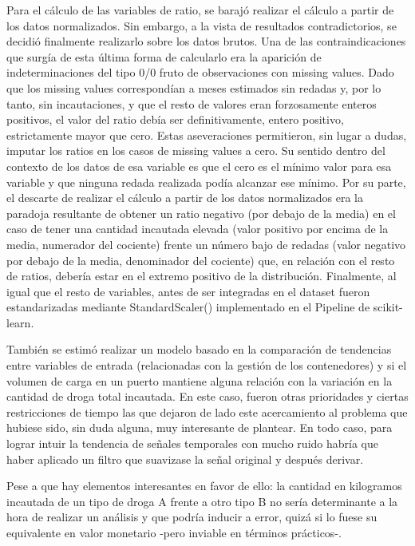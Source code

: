 \documentclass[12pt]{article}
\begin{document}
		Para el cálculo de las variables de ratio, se barajó realizar el cálculo a partir de los datos normalizados. Sin embargo, a la vista de resultados contradictorios, se decidió finalmente realizarlo sobre los datos brutos. Una de las contraindicaciones que surgía de esta última forma de calcularlo era la aparición de indeterminaciones del tipo 0/0 fruto de observaciones con missing values. Dado que los missing values correspondían a meses estimados sin redadas y, por lo tanto, sin incautaciones, y que el resto de valores eran forzosamente enteros positivos, el valor del ratio debía ser definitivamente, entero positivo, estrictamente mayor que cero. Estas aseveraciones permitieron, sin lugar a dudas, imputar los ratios en los casos de missing values a cero. Su sentido dentro del contexto de los datos de esa variable es que el cero es el mínimo valor para esa variable y que ninguna redada realizada podía alcanzar ese mínimo. Por su parte, el descarte de realizar el cálculo a partir de los datos normalizados era la paradoja resultante de obtener un ratio negativo (por debajo de la media) en el caso de tener una cantidad incautada elevada (valor positivo por encima de la media, numerador del cociente) frente un número bajo de redadas (valor negativo por debajo de la media, denominador del cociente) que, en relación con el resto de ratios, debería estar en el extremo positivo de la distribución. Finalmente, al igual que el resto de variables, antes de ser integradas en el dataset fueron estandarizadas mediante StandardScaler() implementado en el Pipeline de scikit-learn.
		
		También se estimó realizar un modelo basado en la comparación de tendencias entre variables de entrada (relacionadas con la gestión de los contenedores) y si el volumen de carga en un puerto mantiene alguna relación con la variación en la cantidad de droga total incautada. En este caso, fueron otras prioridades y ciertas restricciones de tiempo las que dejaron de lado este acercamiento al problema que hubiese sido, sin duda alguna, muy interesante de plantear. En todo caso, para lograr intuir la tendencia de señales temporales con mucho ruido habría que haber aplicado un filtro que suavizase la señal original y después derivar.
		
		Pese a que hay elementos interesantes en favor de ello: la cantidad en kilogramos incautada de un tipo de droga A frente a otro tipo B no sería determinante a la hora de realizar un análisis y que podría inducir a error, quizá si lo fuese su equivalente en valor monetario -pero inviable en términos prácticos-.
		
\end{document}
